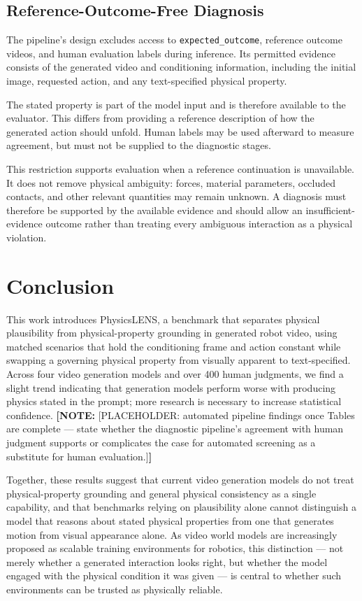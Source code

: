 \documentclass{article} %
\newcommand{\authornote}[1]{\textcolor{AuthorNote}{\textbf{[NOTE:} #1\textbf{]}}}
\begin{document}
\subsection{Reference-Outcome-Free Diagnosis}
\label{sec:ground-truth-free}

The pipeline's design excludes access to
\texttt{expected\_outcome}, reference outcome videos, and
human evaluation labels during inference. Its permitted
evidence consists of the generated video and conditioning
information, including the initial image, requested action,
and any text-specified physical property.

The stated property is part of the model input and is
therefore available to the evaluator. This differs from
providing a reference description of how the generated
action should unfold. Human labels may be used afterward
to measure agreement, but must not be supplied to the
diagnostic stages.

This restriction supports evaluation when a reference
continuation is unavailable. It does not remove physical
ambiguity: forces, material parameters, occluded contacts,
and other relevant quantities may remain unknown.
A diagnosis must therefore be supported by the available
evidence and should allow an insufficient-evidence outcome
rather than treating every ambiguous interaction as a
physical violation.



\section{Conclusion}

This work introduces PhysicsLENS, a benchmark that separates physical plausibility from physical-property grounding in generated robot video, using matched scenarios that hold the conditioning frame and action constant while swapping a governing physical property from visually apparent to text-specified. Across four video generation models and over 400 human judgments, we find a slight trend indicating that generation models perform worse with producing physics stated in the prompt; more research is necessary to increase statistical confidence. \authornote{[PLACEHOLDER: automated pipeline findings once Tables are complete --- state whether the diagnostic pipeline's agreement with human judgment supports or complicates the case for automated screening as a substitute for human evaluation.]} 

Together, these results suggest that current video generation models do not treat physical-property grounding and general physical consistency as a single capability, and that benchmarks relying on plausibility alone cannot distinguish a model that reasons about stated physical properties from one that generates motion from visual appearance alone. As video world models are increasingly proposed as scalable training environments for robotics, this distinction --- not merely whether a generated interaction looks right, but whether the model engaged with the physical condition it was given --- is central to whether such environments can be trusted as physically reliable.
\end{document}
